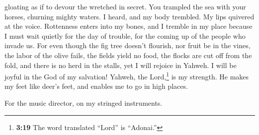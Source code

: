 gloating as if to devour the wretched in secret.  You
trampled the sea with your horses, churning mighty waters.
 I heard, and my body trembled. My lips quivered at the
voice. Rottenness enters into my bones, and I tremble in my place
because I must wait quietly for the day of trouble, for the coming up of
the people who invade us.  For even though the fig tree
doesn't flourish, nor fruit be in the vines, the labor of the olive
fails, the fields yield no food, the flocks are cut off from the fold,
and there is no herd in the stalls,  yet I will rejoice
in Yahweh. I will be joyful in the God of my salvation! 
Yahweh, the Lord,\footnote{\textbf{3:19} The word translated ``Lord'' is
  ``Adonai.''} is my strength. He makes my feet like deer's feet, and
enables me to go in high places.

For the music director, on my stringed instruments.
